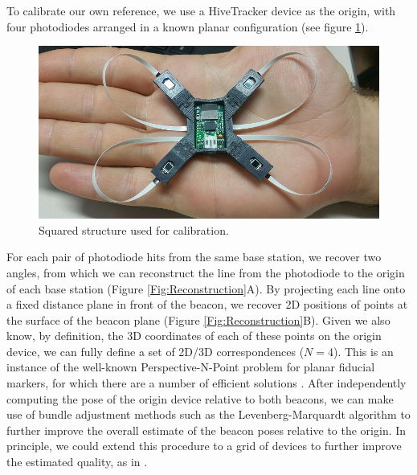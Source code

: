 \documentclass[sigchi]{acmart}
\begin{document}
To calibrate our own reference, we use a HiveTracker device as the origin, with four photodiodes arranged in a known planar configuration (see figure \ref{Fig:squared_structure}).

\begin{figure}[h]
  \centering
  \includegraphics[width=\linewidth]{Figures/squared_structure.jpg}
  \caption{Squared structure used for calibration.}
  \label{Fig:squared_structure}
\end{figure}

For each pair of photodiode hits from the same base station, we recover two angles, from which we can reconstruct the line from the photodiode to the origin of each base station (Figure \ref{Fig:Reconstruction}A). By projecting each line onto a fixed distance plane in front of the beacon, we recover 2D positions of points at the surface of the beacon plane (Figure \ref{Fig:Reconstruction}B). Given we also know, by definition, the 3D coordinates of each of these points on the origin device, we can fully define a set of 2D/3D correspondences ($N = 4$). This is an instance of the well-known Perspective-N-Point problem for planar fiducial markers, for which there are a number of efficient solutions \cite{Lepetit2008,Garrido-Jurado2014}. After independently computing the pose of the origin device relative to both beacons, we can make use of bundle adjustment methods such as the Levenberg-Marquardt algorithm \cite{Marquardt1963} to further improve the overall estimate of the beacon poses relative to the origin. In principle, we could extend this procedure to a grid of devices to further improve the estimated quality, as in \cite{Garrido-Jurado2014}.
\end{document}
